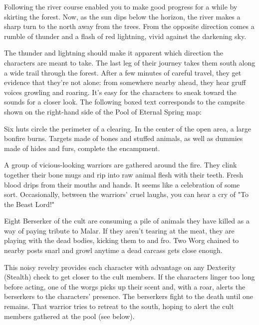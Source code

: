 \documentclass[10pt,a4paper,twoside,bg=print,twocolumn,openany,nodeprecatedcode]{dndbook}
\begin{document}
\begin{DndReadAloud}{}
Following the river course enabled you to make good progress for a while by skirting the forest. Now, as the sun dips below the horizon, the river makes a sharp turn to the north away from the trees. From the opposite direction comes a rumble of thunder and a flash of red lightning, vivid against the darkening sky.

\end{DndReadAloud}

The thunder and lightning should make it apparent which direction the characters are meant to take. The last leg of their journey takes them south along a wide trail through the forest. After a few minutes of careful travel, they get evidence that they're not alone: from somewhere nearby ahead, they hear gruff voices growling and roaring. It's easy for the characters to sneak toward the sounds for a closer look. The following boxed text corresponds to the campsite shown on the right-hand side of the Pool of Eternal Spring map:

\begin{DndReadAloud}{}
Six huts circle the perimeter of a clearing. In the center of the open area, a large bonfire burns. Targets made of bones and stuffed animals, as well as dummies made of hides and furs, complete the encampment.

A group of vicious-looking warriors are gathered around the fire. They clink together their bone mugs and rip into raw animal flesh with their teeth. Fresh blood drips from their mouths and hands. It seems like a celebration of some sort. Occasionally, between the warriors' cruel laughs, you can hear a cry of "To the Beast Lord!"

\end{DndReadAloud}

Eight Berserker of the cult are consuming a pile of animals they have killed as a way of paying tribute to Malar. If they aren't tearing at the meat, they are playing with the dead bodies, kicking them to and fro. Two Worg chained to nearby posts snarl and growl anytime a dead carcass gets close enough.

This noisy revelry provides each character with advantage on any Dexterity (Stealth) check to get closer to the cult members. If the characters linger too long before acting, one of the worgs picks up their scent and, with a roar, alerts the berserkers to the characters' presence. The berserkers fight to the death until one remains. That warrior tries to retreat to the south, hoping to alert the cult members gathered at the pool (see below).
\end{document}
